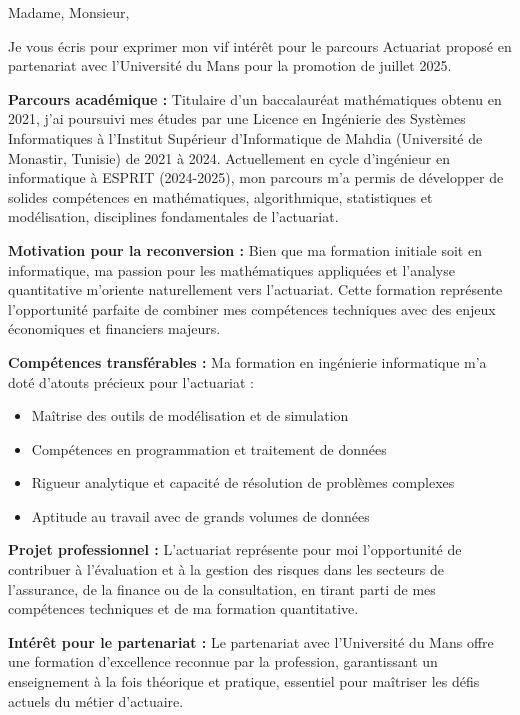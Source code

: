 \documentclass[12pt,a4paper]{article}
\begin{document}
\vspace{1cm}

\noindent
Madame, Monsieur,\\

\vspace{0.5cm}

Je vous écris pour exprimer mon vif intérêt pour le parcours Actuariat proposé en partenariat avec l'Université du Mans pour la promotion de juillet 2025.

\textbf{Parcours académique :}
Titulaire d'un baccalauréat mathématiques obtenu en 2021, j'ai poursuivi mes études par une Licence en Ingénierie des Systèmes Informatiques à l'Institut Supérieur d'Informatique de Mahdia (Université de Monastir, Tunisie) de 2021 à 2024. Actuellement en cycle d'ingénieur en informatique à ESPRIT (2024-2025), mon parcours m'a permis de développer de solides compétences en mathématiques, algorithmique, statistiques et modélisation, disciplines fondamentales de l'actuariat.

\textbf{Motivation pour la reconversion :}
Bien que ma formation initiale soit en informatique, ma passion pour les mathématiques appliquées et l'analyse quantitative m'oriente naturellement vers l'actuariat. Cette formation représente l'opportunité parfaite de combiner mes compétences techniques avec des enjeux économiques et financiers majeurs.

\textbf{Compétences transférables :}
Ma formation en ingénierie informatique m'a doté d'atouts précieux pour l'actuariat :
\begin{itemize}
    \item Maîtrise des outils de modélisation et de simulation
    \item Compétences en programmation et traitement de données
    \item Rigueur analytique et capacité de résolution de problèmes complexes
    \item Aptitude au travail avec de grands volumes de données
\end{itemize}

\textbf{Projet professionnel :}
L'actuariat représente pour moi l'opportunité de contribuer à l'évaluation et à la gestion des risques dans les secteurs de l'assurance, de la finance ou de la consultation, en tirant parti de mes compétences techniques et de ma formation quantitative.

\textbf{Intérêt pour le partenariat :}
Le partenariat avec l'Université du Mans offre une formation d'excellence reconnue par la profession, garantissant un enseignement à la fois théorique et pratique, essentiel pour maîtriser les défis actuels du métier d'actuaire.
\end{document}
